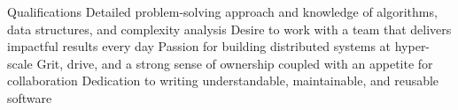 \documentclass[letterpaper, 10pt]{report}
\makeatletter
\newcommand{\resumeProjectHeading}[2]{
    \begin{tabular*}{\textwidth}{l@{\extracolsep{\fill}}r}
        \small#1 & #2 \\
    \end{tabular*}\vspace{-1.5em}
}
\newenvironment{ResumeItem}{
    \vspace{-0.3em}
    \begin{itemize}
        \setlength\itemsep{-0.3em}
        }{
    \end{itemize}\vspace{-0.3em}}
\newcommand{\cxx}{C\nolinebreak\hspace{-.05em}\raisebox{0.03ex}{\bf +}\nolinebreak\hspace{-.05em}\raisebox{.03ex}{\bf +}}
\makeatother
\begin{document}



\textcolor{Cream}{\fontsize{0.1pt}{0.1pt}\selectfont%
%
Qualifications
%
Detailed problem-solving approach and knowledge of algorithms, data structures, and complexity analysis
Desire to work with a team that delivers impactful results every day
Passion for building distributed systems at hyper-scale
Grit, drive, and a strong sense of ownership coupled with an appetite for collaboration
Dedication to writing understandable, maintainable, and reusable software
}
\end{document}
